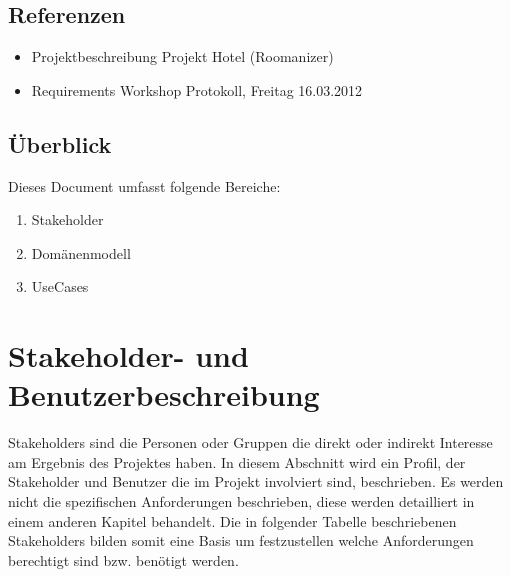 \documentclass[10pt,a4paper,titlepage]{article}
\begin{document}
\subsection{Referenzen}
\begin{itemize}
	\item Projektbeschreibung Projekt Hotel (Roomanizer) 
	\item Requirements Workshop Protokoll, Freitag 16.03.2012
\end{itemize}

\subsection{Überblick}
Dieses Document umfasst folgende Bereiche:
\begin{enumerate}
	\item Stakeholder
	\item Domänenmodell
	\item UseCases 
\end{enumerate}

\newpage

\section{Stakeholder- und Benutzerbeschreibung}
Stakeholders sind die Personen oder Gruppen die direkt oder indirekt Interesse am Ergebnis des Projektes haben. In diesem Abschnitt wird ein Profil, der Stakeholder und Benutzer die im Projekt involviert sind, beschrieben. Es werden nicht die spezifischen Anforderungen beschrieben, diese werden detailliert in einem anderen Kapitel behandelt. Die in folgender Tabelle beschriebenen Stakeholders bilden somit eine Basis um festzustellen welche Anforderungen berechtigt sind bzw. benötigt werden. 
\end{document}
